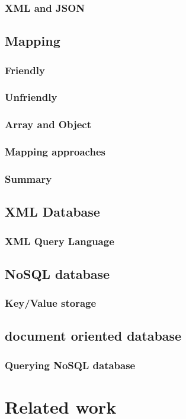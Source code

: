 \documentclass[a4paper,12pt]{article}
\begin{document}
		\subsubsection{XML and JSON}
		\subsection{Mapping}
			\subsubsection{Friendly}
			\subsubsection{Unfriendly}
			\subsubsection{Array and Object}
			\subsubsection{Mapping approaches}
			\subsubsection{Summary}
		\subsection{XML Database}
			\subsubsection{XML Query Language}
		\subsection{NoSQL database}
			\subsubsection{Key/Value storage}
			\subsection{document oriented database}
		\subsubsection{Querying NoSQL database}
		
	\newpage
	\section{Related work}
	\newpage
\end{document}
